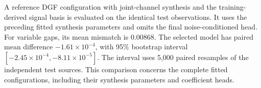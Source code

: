 \documentclass[10pt,prd,aps,a4paper,twocolumn,superscriptaddress,nofootinbib,floatfix]{revtex4-2}
\begin{document}
A reference DGF configuration with joint-channel synthesis and the training-derived signal basis is evaluated on the identical test observations. It uses the preceding fitted synthesis parameters and omits the final noise-conditioned head. For variable gaps, its mean mismatch is 0.00868. The selected model has paired mean difference $-1.61\times10^{-4}$, with 95\% bootstrap interval $[-2.45\times10^{-4},-8.11\times10^{-5}]$. The interval uses 5,000 paired resamples of the independent test sources. This comparison concerns the complete fitted configurations, including their synthesis parameters and coefficient heads.


\end{document}
